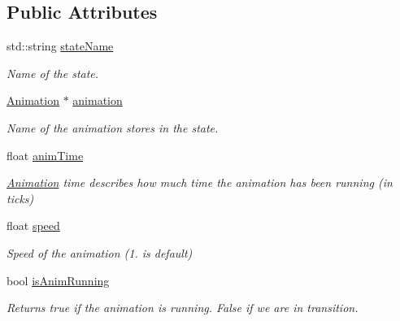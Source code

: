 \subsection*{Public Attributes}
\begin{DoxyCompactItemize}
\item 
\mbox{\label{structAnimState_a3fc2bc133d23f7e11646e98b21a509b7}} 
std\+::string \hyperlink{structAnimState_a3fc2bc133d23f7e11646e98b21a509b7}{state\+Name}
\begin{DoxyCompactList}\small\item\em Name of the state. \end{DoxyCompactList}\item 
\mbox{\label{structAnimState_a69e8df8ec31e861fa4313081a0114091}} 
\hyperlink{structAnimation}{Animation} $\ast$ \hyperlink{structAnimState_a69e8df8ec31e861fa4313081a0114091}{animation}
\begin{DoxyCompactList}\small\item\em Name of the animation stores in the state. \end{DoxyCompactList}\item 
\mbox{\label{structAnimState_a83742f16bd6f9650fbc493523d8b5b6c}} 
float \hyperlink{structAnimState_a83742f16bd6f9650fbc493523d8b5b6c}{anim\+Time}
\begin{DoxyCompactList}\small\item\em \hyperlink{structAnimation}{Animation} time describes how much time the animation has been running (in ticks) \end{DoxyCompactList}\item 
\mbox{\label{structAnimState_a25790df877ce752e839f7f4db199f446}} 
float \hyperlink{structAnimState_a25790df877ce752e839f7f4db199f446}{speed}
\begin{DoxyCompactList}\small\item\em Speed of the animation (1. is default) \end{DoxyCompactList}\item 
\mbox{\label{structAnimState_a6162838804ebe7bbe208d3affa089308}} 
bool \hyperlink{structAnimState_a6162838804ebe7bbe208d3affa089308}{is\+Anim\+Running}
\begin{DoxyCompactList}\small\item\em Returns true if the animation is running. False if we are in transition. \end{DoxyCompactList}\item 

\end{DoxyCompactItemize}
